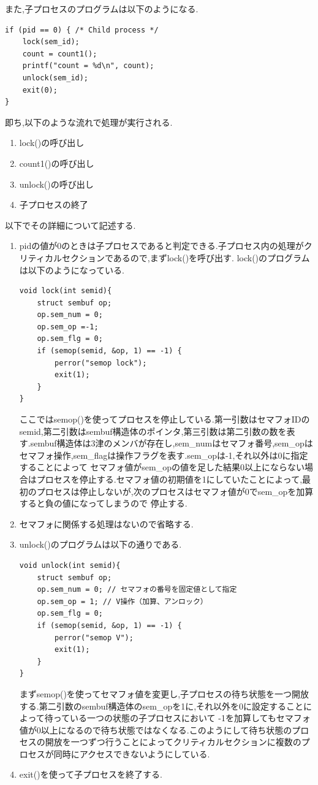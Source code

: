 \documentclass[dvipdfmx]{jarticle}
\begin{document}
また,子プロセスのプログラムは以下のようになる.
\begin{lstlisting}
if (pid == 0) { /* Child process */
    lock(sem_id);
    count = count1();
    printf("count = %d\n", count);
    unlock(sem_id);
    exit(0);
}
\end{lstlisting}
即ち,以下のような流れで処理が実行される.
\begin{enumerate}
    \item lock()の呼び出し
    \item count1()の呼び出し
    \item unlock()の呼び出し
    \item 子プロセスの終了
\end{enumerate}
以下でその詳細について記述する.
\begin{enumerate}
    \item pidの値が0のときは子プロセスであると判定できる.子プロセス内の処理がクリティカルセクションであるので,まずlock()を呼び出す.
    lock()のプログラムは以下のようになっている.
    \begin{lstlisting}
void lock(int semid){
    struct sembuf op;
    op.sem_num = 0;
    op.sem_op =-1;
    op.sem_flg = 0;
    if (semop(semid, &op, 1) == -1) {
        perror("semop lock");
        exit(1);
    }
}
    \end{lstlisting}
    ここではsemop()を使ってプロセスを停止している.第一引数はセマフォIDのsemid,第二引数はsembuf構造体のポインタ,第三引数は第二引数の数を表す.sembuf構造体は3津のメンバが存在し,sem\_numはセマフォ番号,sem\_opはセマフォ操作,sem\_flagは操作フラグを表す.\cite{4}sem\_opは-1,それ以外は0に指定することによって
    セマフォ値がsem\_opの値を足した結果0以上にならない場合はプロセスを停止する.セマフォ値の初期値を1にしていたことによって,最初のプロセスは停止しないが,次のプロセスはセマフォ値が0でsem\_opを加算すると負の値になってしまうので
    停止する.
    \item セマフォに関係する処理はないので省略する.
    \item unlock()のプログラムは以下の通りである.
    \begin{lstlisting}
void unlock(int semid){
    struct sembuf op;
    op.sem_num = 0; // セマフォの番号を固定値として指定
    op.sem_op = 1; // V操作（加算、アンロック）
    op.sem_flg = 0;
    if (semop(semid, &op, 1) == -1) {
        perror("semop V");
        exit(1);
    }
}
    \end{lstlisting}
    まずsemop()を使ってセマフォ値を変更し,子プロセスの待ち状態を一つ開放する.第二引数のsembuf構造体のsem\_opを1に,それ以外を0に設定することによって待っている一つの状態の子プロセスにおいて
    -1を加算してもセマフォ値が0以上になるので待ち状態ではなくなる.このようにして待ち状態のプロセスの開放を一つずつ行うことによってクリティカルセクションに複数のプロセスが同時にアクセスできないようにしている.
    \item exit()を使って子プロセスを終了する.
\end{enumerate}
\end{document}

